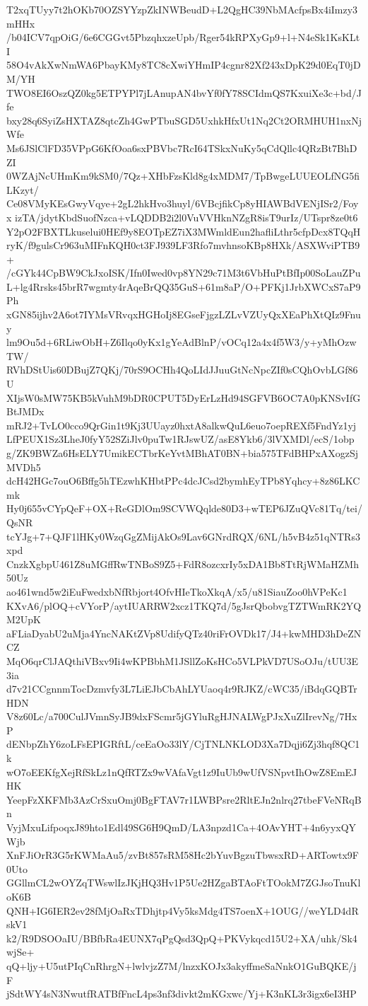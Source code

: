 T2xqTUyy7t2hOKb70OZSYYzpZkINWBeudD+L2QgHC39NbMAcfpsBx4iImzy3mHHx
/b04ICV7qpOiG/6e6CGGvt5PbzqhxzeUpb/Rger54kRPXyGp9+l+N4eSk1KsKLtI
58O4vAkXwNmWA6PbayKMy8TC8cXwiYHmIP4cgnr82Xf243xDpK29d0EqT0jDM/YH
TWO8EI6OszQZ0kg5ETPYPl7jLAnupAN4bvYf0fY78SCIdmQS7KxuiXe3c+bd/Jfe
bxy28q6SyiZsHXTAZ8qtcZh4GwPTbuSGD5UxhkHfxUt1Nq2Ct2ORMHUH1nxNjWfe
Ms6JSlClFD35VPpG6KfOoa6sxPBVbc7RcI64TSkxNuKy5qCdQllc4QRzBt7BhDZI
0WZAjNcUHmKm9kSM0/7Qz+XHbFzsKld8g4xMDM7/TpBwgeLUUEOLfNG5fiLKzyt/
Ce08VMyKEsGwyVqye+2gL2hkHvo3huyl/6VBcjfikCp8yHIAWBdVENjISr2/Foyx
izTA/jdytKbdSuofNzca+vLQDDB2i2l0VuVVHknNZgR8isT9urIz/UTspr8ze0t6
Y2pO2FBXTLkuselui0HEf9y8EOTpEZ7iX3MWmldEun2hafliLthr5cfpDcx8TQqH
ryK/f9gulsCr963uMIFnKQH0ct3FJ939LF3Rfo7mvhnsoKBp8HXk/ASXWviPTB9+
/cGYk44CpBW9CkJxoISK/Ifn0Iwed0vp8YN29c71M3t6VbHuPtBfIp00SoLauZPu
L+lg4Rrsks45brR7wgmty4rAqeBrQQ35GuS+61m8aP/O+PFKj1JrbXWCxS7aP9Ph
xGN85ijhv2A6ot7IYMsVRvqxHGHoIj8EGseFjgzLZLvVZUyQxXEaPhXtQIz9Fnuy
lm9Ou5d+6RLiwObH+Z6Ilqo0yKx1gYeAdBlnP/vOCq12a4x4f5W3/y+yMhOzwTW/
RVhDStUis60DBujZ7QKj/70rS9OCHh4QoLIdJJuuGtNcNpcZIf0sCQhOvbLGf86U
XIjsW0sMW75KB5kVuhM9bDR0CPUT5DyErLzHd94SGFVB6OC7A0pKNSvIfGBtJMDx
mRJ2+TvLO0cco9QrGin1t9Kj3UUayz0hxtA8alkwQuL6euo7oepREXf5FndYz1yj
LfPEUX1Sz3LheJ0fyY52SZiJlv0puTw1RJswUZ/asE8Ykb6/3lVXMDl/ecS/1obp
g/ZK9BWZa6HsELY7UmikECTbrKeYvtMBhAT0BN+bia575TFdBHPxAXogzSjMVDh5
dcH42HGc7ouO6Bffg5hTEzwhKHbtPPc4dcJCsd2bymhEyTPb8Yqhcy+8z86LKCmk
Hy0j655vCYpQeF+OX+ReGDlOm9SCVWQqlde80D3+wTEP6JZuQVc81Tq/tei/QsNR
tcYJg+7+QJF1lHKy0WzqGgZMijAkOs9Lav6GNrdRQX/6NL/h5vB4z51qNTRs3xpd
CnzkXgbpU461Z8uMGffRwTNBoS9Z5+FdR8ozcxrIy5xDA1Bb8TtRjWMaHZMh50Uz
ao461wnd5w2iEuFwedxbNfRbjort4OfvHIeTkoXkqA/x5/u81SiauZoo0hVPeKc1
KXvA6/plOQ+cVYorP/aytIUARRW2xcz1TKQ7d/5gJsrQbobvgTZTWmRK2YQM2UpK
aFLiaDyabU2uMja4YncNAKtZVp8UdifyQTz40riFrOVDk17/J4+kwMHD3hDeZNCZ
MqO6qrClJAQthiVBxv9Ii4wKPBbhM1JSllZoKsHCo5VLPkVD7USoOJu/tUU3E3ia
d7v21CCgnnmTocDzmvfy3L7LiEJbCbAhLYUaoq4r9RJKZ/cWC35/iBdqGQBTrHDN
V8z60Lc/a700CulJVmnSyJB9dxFScmr5jGYluRgHJNALWgPJxXuZlIrevNg/7HxP
dENbpZhY6zoLFsEPIGRftL/ceEaOo33lY/CjTNLNKLOD3Xa7Dqji6Zj3hqf8QC1k
wO7oEEKfgXejRfSkLz1nQfRTZx9wVAfaVgt1z9IuUb9wUfVSNpvtIhOwZ8EmEJHK
YeepFzXKFMb3AzCrSxuOmj0BgFTAV7r1LWBPsre2RltEJn2nlrq27tbeFVeNRqBn
VyjMxuLifpoqxJ89hto1Edl49SG6H9QmD/LA3npzd1Ca+4OAvYHT+4n6yyxQYWjb
XnFJiOrR3G5rKWMaAu5/zvBt857sRM58Hc2bYuvBgzuTbwsxRD+ARTowtx9F0Uto
GGllmCL2wOYZqTWswlIzJKjHQ3Hv1P5Ue2HZgaBTAoFtTOokM7ZGJsoTnuKloK6B
QNH+IG6IER2ev28fMjOaRxTDhjtp4Vy5ksMdg4TS7oenX+1OUG//weYLD4dRskV1
k2/R9DSOOaIU/BBfbRa4EUNX7qPgQsd3QpQ+PKVykqcd15U2+XA/uhk/Sk4wjSe+
qQ+ljy+U5utPIqCnRhrgN+lwlvjzZ7M/lnzxKOJx3akyffmeSaNnkO1GuBQKE/jF
jSdtWY4sN3NwutfRATBfFncL4ps3nf3divkt2mKGxwc/Yj+K3nKL3r3igx6eI3HP
